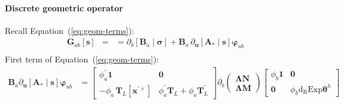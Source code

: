 \paragraph{Discrete geometric operator}
Recall Equation~(\ref{eq:geom-terms}):
\begin{equation*} 
\begin{aligned}
\bm{G}_{ab}[\bm{s}] &= 
&= \partial_b[\bm{B}_a\mid\bm{\sigma}] + \bm{B}_a \, \partial_{\bm{u}} [\bm{A}_*\mid\bm{s}] \bm{\varphi}_{u b} \\
\end{aligned}
\end{equation*}
First term of Equation~(\ref{eq:geom-terms}): %
\begin{equation*} 
   \begin{aligned}
   \bm{B}_a \partial_{\bm{u}} [\bm{A}_*\mid\bm{s}]\bm{\varphi}_{u b}
   &= \begin{bmatrix}
   \phi_a^\prime\mathbf{1} & \mathbf{0} \\
   -\phi_a \,\mathbf{T}_{\scriptscriptstyle{L}} [\bm{x}^{\prime\times}] & \phi_a^\prime \mathbf{T}_{\scriptscriptstyle{L}}+ \phi_a\mathbf{T}_{\scriptscriptstyle{L}}^{\prime}
   \end{bmatrix}
   \partial_b\begin{pmatrix}
   \bm{\Lambda}\bm{N} \\ \bm{\Lambda} \bm{M}
   \end{pmatrix}  \begin{bmatrix}
   \phi_b \mathbf{1} & \mathbf{0} \\
   \mathbf{0} & \phi_b \operatorname{d_{\scriptscriptstyle{R}}Exp}\bm{\theta}^h
   \end{bmatrix} \\
   \end{aligned}
\end{equation*}
%
